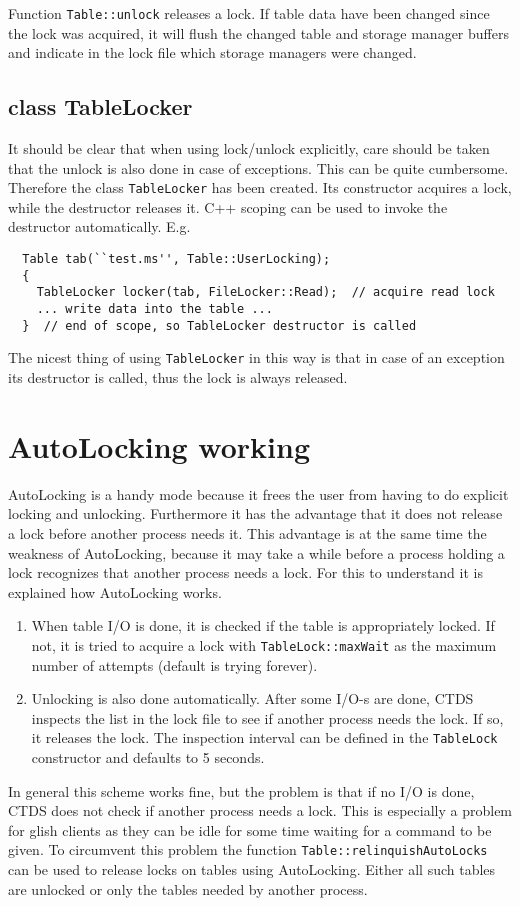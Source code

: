 Function \texttt{Table::unlock} releases a lock. If table data have
been changed since the lock was acquired, it will flush the changed
table and storage manager buffers and indicate in the lock file which
storage managers were changed.

\subsection{class TableLocker}
It should be clear that when using lock/unlock explicitly, care should
be taken that the unlock is also done in case of exceptions. This can
be quite cumbersome. Therefore the class \texttt{TableLocker} has
been created. Its constructor acquires a lock, while the destructor
releases it. C++ scoping can be used to invoke the destructor
automatically. E.g.
\begin{verbatim}
  Table tab(``test.ms'', Table::UserLocking);
  {
    TableLocker locker(tab, FileLocker::Read);  // acquire read lock
    ... write data into the table ...
  }  // end of scope, so TableLocker destructor is called
\end{verbatim}
The nicest thing of using \texttt{TableLocker} in this way is that
in case of an exception
its destructor is called, thus the lock is always released.

\section{\label{TABLELOCK:AUTOLOCKING}AutoLocking working}
AutoLocking is a handy mode because it frees the user from having to
do explicit locking and unlocking. Furthermore it has the advantage
that it does not release a lock before another process needs it.
This advantage is at the same time the weakness of
AutoLocking, because it may take a while before a process holding a
lock recognizes that another process needs a lock. For this to
understand it is explained how AutoLocking works.
\begin{enumerate}
\item When table I/O is done, it is checked if the table is
appropriately locked. If not, it is tried to acquire a lock
with \texttt{TableLock::maxWait} as the maximum number of attempts
(default is trying forever).
\item Unlocking is also done automatically. After some I/O-s are done,
CTDS inspects the list in the lock file to see if another
process needs the lock. If so, it releases the lock.
The inspection interval can be defined in the \texttt{TableLock}
constructor and defaults to 5 seconds.
\end{enumerate}
In general this scheme works fine, but the problem is that if no I/O is
done, CTDS does not check if another process needs a lock.
This is especially a problem for glish clients as they can be idle for
some time waiting for a command to be given. To circumvent this problem
the function \texttt{Table::relinquishAutoLocks} can be used to
release locks on tables using AutoLocking. Either all such tables are
unlocked or only the tables needed by another process.

